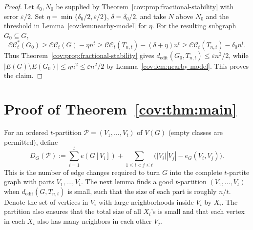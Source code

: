 \documentclass[11pt]{article}
\numberwithin{equation}{section}
\theoremstyle{remark}
\newcommand{\CC}{\mathcal{CC}}
\newcommand{\CCstar}{\mathcal{CC}^{*}}
\newcommand{\ed}{d_{\mathrm{edit}}}
\begin{document}
\begin{proof}
Let \(\delta_0,N_0\) be supplied by Theorem~\ref{cov:prop:fractional-stability} with error \(\varepsilon/2\). 
Set \(\eta=\min\{\delta_0/2,\varepsilon/2\}\), \(\delta=\delta_0/2\), and take
\(N\) above \(N_0\) and the threshold in Lemma~\ref{cov:lem:nearby-model}
for \(\eta\).  For the resulting subgraph \(G_0\subseteq G\),
\begin{equation*}
\CCstar_t(G_0)
 \ge \CC_t(G)-\eta n^t
 \ge \CC_t(T_{n,t})-(\delta+\eta)n^t
 \ge \CC_t(T_{n,t})-\delta_0 n^t.
\end{equation*}
Thus Theorem~\ref{cov:prop:fractional-stability} gives \(\ed(G_0,T_{n,t})\le\varepsilon n^2/2\), while
\(|E(G)\setminus E(G_0)|\le\eta n^2\le\varepsilon n^2/2\) by Lemma~\ref{cov:lem:nearby-model}. This proves the claim.
\end{proof}

\section{Proof of Theorem~\ref{cov:thm:main}}\label{cov:sec:transversal matching}

For an ordered \(t\)-partition \(\mathcal P=(V_1,\ldots,V_t)\) of \(V(G)\) (empty classes are permitted), define
\begin{equation*}
D_G(\mathcal P):=
\sum_{i=1}^t e(G[V_i])
+
\sum_{1\le i<j\le t}\bigl(|V_i||V_j|-e_G(V_i,V_j)\bigr).
\end{equation*}
This is the number of edge changes required to turn \(G\) into the complete \(t\)-partite graph with parts \(V_1,\ldots,V_t\).
The next lemma finds a good \(t\)-partition \((V_1,\ldots,V_t)\)
when \(\ed(G,T_{n,t})\) is small, such that the size of each part is roughly \(n/t\).
Denote the set of vertices in \(V_i\) with large neighborhoods inside \(V_i\) by \(X_i\).
The partition also ensures that the total size of all \(X_i\)'s is small and that each vertex
in each \(X_i\) also has many neighbors in each other \(V_j\).
\end{document}

